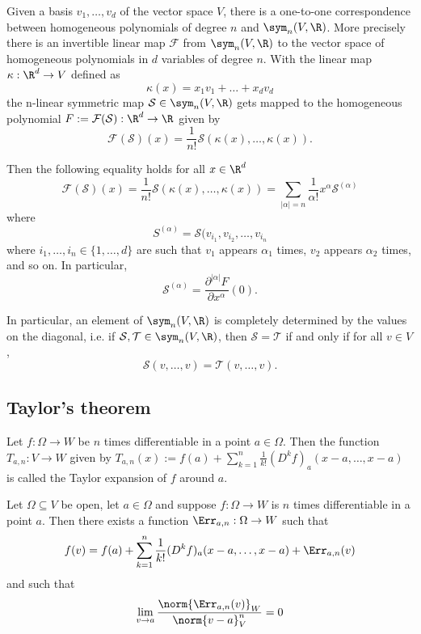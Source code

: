 \begin{lemma} 
    Given a basis $v_1,\dots,v_d$ of the vector space $V$, there is a one-to-one correspondence
    between homogeneous polynomials of degree $n$ and $\sym_n(V,\R)$. More precisely there is an
    invertible linear map $\mathcal F$ from $\sym_n(V,\R)$ to the vector space of homogeneous
    polynomials in $d$ variables of degree $n$. With the linear map $\kappa:\R^d \to V$ defined as
    $$\kappa(x) = x_1v_1 + \dots + x_dv_d$$
    the n-linear symmetric map $\mathcal S \in \sym_n(V,\R)$ gets mapped to the homogeneous polynomial
    $F:=\mathcal F(\mathcal S):\R^d \to \R$ given by
    $$\mathcal F(\mathcal S)(x) = \frac{1}{n!}\mathcal S(\kappa(x),\dots,\kappa(x)).$$

    Then the following equality holds for all $x \in \R^d$
    $$\mathcal F(\mathcal S)(x) = \frac{1}{n!}\mathcal S(\kappa(x),\dots,\kappa(x)) = \sum_{|\alpha|=n}\frac{1}{\alpha!}x^\alpha\mathcal S^{(\alpha)}$$
    where
    $$S^{(\alpha)} = \mathcal S(v_{i_1}, v_{i_2},\dots, v_{i_n}$$
    where $i_1,\dots,i_n \in \{1,\dots,d\}$ are such that $v_1$ appears $\alpha_1$ times, $v_2$ appears $\alpha_2$ times, and so on.
    In particular,
    $$\mathcal S^{(\alpha)} = \frac{\partial^{|\alpha|}F}{\partial x^\alpha}(0).$$

    In particular, an element of $\sym_n(V,\R)$ is completely determined by the values on the diagonal, i.e. if
    $\mathcal S, \mathcal T \in \sym_n(V,\R)$, then $\mathcal S = \mathcal T$ if and only if 
    for all $v \in V$,
    $$\mathcal S(v,\dots,v) = \mathcal T(v,\dots, v).$$
\end{lemma}

\subsection{Taylor's theorem}
\begin{definition}
    Let $f: \Omega \to W$ be $n$ times differentiable in a point $a \in \Omega$.
    Then the function $T_{a,n}:V \to W$ given by
    $T_{a,n}(x) := f(a) + \sum_{k=1}^n\frac{1}{k!}(D^kf)_a(x-a,\dots,x-a)$
    is called the Taylor expansion of $f$ around $a$.
\end{definition}

\begin{theorem}
    Let $\Omega \subseteq V$ be open, let $a \in \Omega$ and suppose $f: \Omega \to W$
    is $n$ times differentiable in a point $a$. Then there exists a function 
    $\Err_{a,n}:\Omega \to W$ such that
    $$f(v) = f(a) + \sum_{k=1}^n\frac{1}{k!}(D^kf)_a(x-a,\dots,x-a) + \Err_{a,n}(v)$$
    and such that
    $$\lim_{v \to a}\frac{\norm{\Err_{a,n}(v)}_W}{\norm{v-a}_V^n} = 0$$
\end{theorem}

